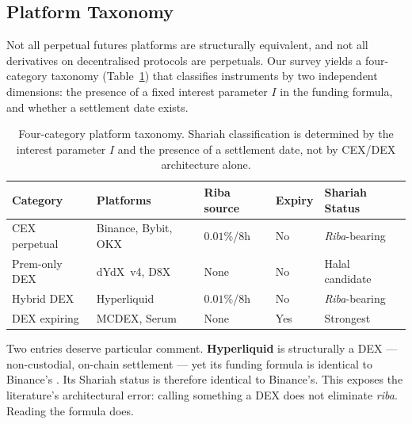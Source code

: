 \documentclass[10pt,twocolumn]{article}
\begin{document}
\subsection{Platform Taxonomy}

Not all perpetual futures platforms are structurally equivalent, and not all
derivatives on decentralised protocols are perpetuals. Our survey yields a
four-category taxonomy (Table~\ref{tab:taxonomy}) that classifies instruments
by two independent dimensions: the presence of a fixed interest parameter $I$
in the funding formula, and whether a settlement date exists.

\begin{table}[htbp]
\centering
\caption{Four-category platform taxonomy. Shariah classification is determined
by the interest parameter $I$ and the presence of a settlement date, not by
CEX/DEX architecture alone.}
\label{tab:taxonomy}
\footnotesize
\setlength{\tabcolsep}{2pt}
\begin{tabular}{@{}p{1.45cm}p{1.6cm}p{1.4cm}p{1.05cm}p{1.35cm}@{}}
\toprule
\textbf{Category} & \textbf{Platforms} & \textbf{Riba source} & \textbf{Expiry} & \textbf{Shariah Status} \\
\midrule
CEX perpetual & Binance, Bybit, OKX & \mbox{\textcolor{ribared}{$0.01\%$/8h}} & No
  & \textcolor{ribared}{\textit{Riba}-bearing} \\[3pt]
Prem-only DEX & dYdX~v4, D8X & \mbox{\textcolor{halalgreen}{None}} & No
  & \textcolor{halalgreen}{Halal candidate} \\[3pt]
Hybrid DEX & Hyperliquid & \mbox{\textcolor{ribared}{$0.01\%$/8h}} & No
  & \textcolor{ribared}{\textit{Riba}-bearing} \\[3pt]
DEX expiring & MCDEX, Serum & \mbox{\textcolor{halalgreen}{None}} & Yes
  & \textcolor{halalgreen}{Strongest} \\
\bottomrule
\end{tabular}
\end{table}

Two entries deserve particular comment.
\textbf{Hyperliquid} is structurally a DEX --- non-custodial, on-chain
settlement --- yet its funding formula is identical to Binance's
\cite{Hyperliquid2025}. Its Shariah status is therefore identical to Binance's.
This exposes the literature's architectural error: calling something a DEX does
not eliminate \textit{riba}. Reading the formula does.
\end{document}
